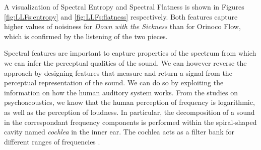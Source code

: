 A visualization of Spectral Entropy and Spectral Flatness is shown in Figures \ref{fig:LLFs:entropy} and \ref{fig:LLFs:flatness} respectively. Both features capture higher values of noisiness for \textit{Down with the Sickness} than for Orinoco Flow, which is confirmed by the listening of the two pieces.

Spectral features are important %
to capture properties of the spectrum from which we can infer the perceptual qualities of the sound. %
We can however reverse the approach by designing features that measure and return a signal from the perceptual representation of the sound. We can do so by exploiting the information on how the human auditory system works. From the studies on psychoacoustics, we know that the human perception of frequency is logarithmic, as well as the perception of loudness. In particular, the decomposition of a sound in the correspondant frequency components is performed within the spiral-shaped cavity named \textit{cochlea} in the inner ear. The cochlea acts as a filter bank for different ranges of frequencies \cite{miotto2011}. 

